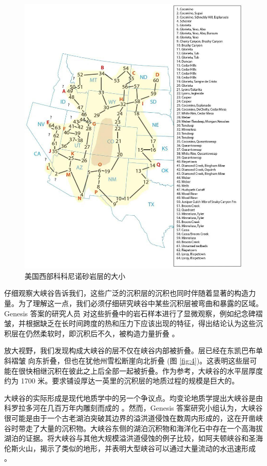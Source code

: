 \documentclass[10pt,twocolumn,letterpaper]{article}
\begin{document}
\begin{figure}[t]
\begin{center}
   \includegraphics[width=1\linewidth]{coconino.jpg}
\end{center}
   \caption{美国西部科科尼诺砂岩层的大小 \cite{21}}
\label{fig:3}
\label{fig:onecol}
\end{figure}

仔细观察大峡谷告诉我们，这些广泛的沉积层的沉积也同时伴随着显著的构造力量。为了理解这一点，我们必须仔细研究峡谷中某些沉积层被弯曲和暴露的区域。Genesis 答案的研究人员 \cite{42} 对这些折叠中的岩石样本进行了显微观察，例如纪念碑褶皱，并根据缺乏在长时间跨度的热和压力下应该出现的特征，得出结论认为这些沉积层在仍然柔软时，即沉积后不久，被构造力量折叠 \cite{43}。

放大视野，我们发现构成大峡谷的层不仅在峡谷内部被折叠。层已经在东凯巴布单斜褶皱 \cite{46} 向东折叠，但也在犹他州雪松断崖向北折叠 (图 \ref{fig:4})。这表明这些层可能在很快相继沉积在彼此之上后全部一起被折叠。作为参考，大峡谷的水平层厚度约为 1700 米。要求铺设厚达一英里的沉积层的地质过程的规模是巨大的。

大峡谷的实际形成是现代地质学中的另一个争议点。均变论地质学提出大峡谷是由科罗拉多河在几百万年内雕刻而成的 \cite{47}。然而，Genesis 答案研究小组认为，大峡谷很可能是由于一个古老湖泊突破其边界的溢洪道侵蚀在数周内形成的，这在开凿峡谷时带走了大量的沉积物。大峡谷东侧的湖泊沉积物和海洋化石中存在一个高海拔湖泊的证据。将大峡谷与其他大规模溢洪道侵蚀的例子比较，如阿夫顿峡谷和圣海伦斯火山，揭示了类似的地形，并表明大型峡谷可以通过大量流动的水迅速形成 \cite{48}。
\end{document}
